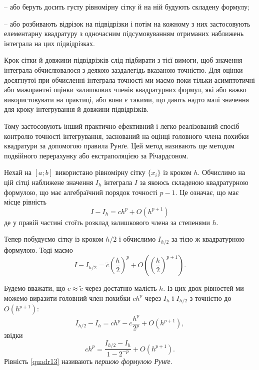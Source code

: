 \documentclass[14pt,twoside]{extreport}
\theoremstyle{mystyle}
\numberwithin{equation}{chapter}
\begin{document}
-- або беруть досить густу рівномірну сітку й на ній будують складену формулу;

-- або розбивають відрізок на підвідрізки і потім на кожному з них застосовують елементарну квадратуру з одночасним підсумовуванням отриманих наближень інтеграла на цих підвідрізках.

Крок сітки й довжини підвідрізків слід підбирати з тієї вимоги, щоб значення інтеграла обчислювалося з деякою заздалегідь вказаною точністю. Для оцінки досягнутої при обчисленні інтеграла точності ми маємо поки тільки асимптотичні або мажорантні оцінки залишкових членів квадратурних формул, які або важко використовувати на практиці, або вони є такими, що дають надто малі значення для кроку інтегрування й довжини підвідрізків.

Тому застосовують інший практично ефективний і легко реалізований спосіб контролю точності інтегрування, заснований на оцінці головного члена похибки квадратури за допомогою правила Рунґе. Цей метод називають ще методом подвійного перерахунку або екстраполяцією за Річардсоном.

Нехай на $[a; b]$ використано рівномірну сітку $\{x_i\}$ із кроком $h$. Обчислимо на цій сітці наближене значення $I_h$ інтеграла $I$ за якоюсь складеною квадратурною формулою, що має алгебраїчний порядок точності $p - 1$. Це означає, що має місце рівність
\begin{equation}\label{quadr11}
I-I_{h}=ch^{p}+O(h^{p+1})
\end{equation}
де у правій частині стоїть розклад залишкового члена за степенями $h$.

Тепер побудуємо сітку із кроком $h/2$ і обчислимо $I_{h/2}$ за тією ж квадратурною формулою. Тоді маємо
\begin{equation}\label{quadr12}
I-I_{h/2}=\displaystyle \tilde{c}\left(\frac{h}{2}\right)^{p}+O\left(\left(\frac{h}{2}\right)^{p+1}\right).
\end{equation}

Будемо вважати, що $c \approx \tilde{c}$ через достатню малість $h$. Із цих двох рівностей ми можемо виразити головний член похибки $ch^p$ через $I_h$ і $I_{h/2}$ з точністю до $O\left(h^{p+1}\right)$:
\[
I_{h/2}-I_{h}=ch^{p}-c\frac{h^{p}}{2^{p}}+O\left(h^{p+1}\right),
\]
звідки
\begin{equation}\label{quadr13}
ch^{p}=\displaystyle \frac{I_{h/2}-I_{h}}{1-2^{-p}}+O\left(h^{p+1}\right).
\end{equation}
Рівність \eqref{quadr13} називають \emph{першою формулою Рунґе}.
\end{document}
